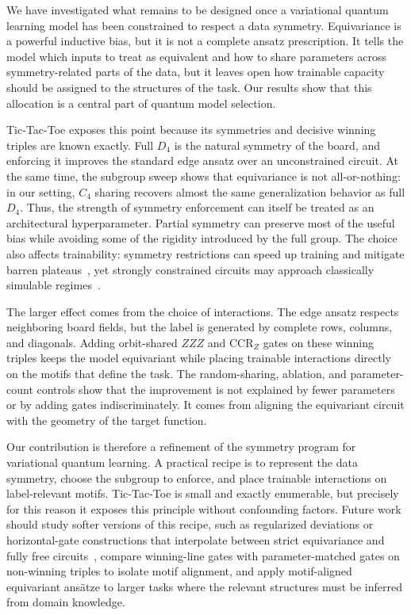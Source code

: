 We have investigated what remains to be designed once a variational quantum learning model has been constrained to respect a data symmetry. Equivariance is a powerful inductive bias, but it is not a complete ansatz prescription. It tells the model which inputs to treat as equivalent and how to share parameters across symmetry-related parts of the data, but it leaves open how trainable capacity should be assigned to the structures of the task. Our results show that this allocation is a central part of quantum model selection.

Tic-Tac-Toe exposes this point because its symmetries and decisive winning triples are known exactly. Full $D_4$ is the natural symmetry of the board, and enforcing it improves the standard edge ansatz over an unconstrained circuit. At the same time, the subgroup sweep shows that equivariance is not all-or-nothing: in our setting, $C_4$ sharing recovers almost the same generalization behavior as full $D_4$. Thus, the strength of symmetry enforcement can itself be treated as an architectural hyperparameter. Partial symmetry can preserve most of the useful bias while avoiding some of the rigidity introduced by the full group. The choice also affects trainability: symmetry restrictions can speed up training and mitigate barren plateaus~\cite{sauvage2024building,cerezo2023simulability}, yet strongly constrained circuits may approach classically simulable regimes~\cite{cerezo2023simulability}.

The larger effect comes from the choice of interactions. The edge ansatz respects neighboring board fields, but the label is generated by complete rows, columns, and diagonals. Adding orbit-shared $ZZZ$ and $\mathrm{CCR}_Z$ gates on these winning triples keeps the model equivariant while placing trainable interactions directly on the motifs that define the task. The random-sharing, ablation, and parameter-count controls show that the improvement is not explained by fewer parameters or by adding gates indiscriminately. It comes from aligning the equivariant circuit with the geometry of the target function.

Our contribution is therefore a refinement of the symmetry program for variational quantum learning. A practical recipe is to represent the data symmetry, choose the subgroup to enforce, and place trainable interactions on label-relevant motifs. Tic-Tac-Toe is small and exactly enumerable, but precisely for this reason it exposes this principle without confounding factors. Future work should study softer versions of this recipe, such as regularized deviations or horizontal-gate constructions that interpolate between strict equivariance and fully free circuits~\cite{wiersema2025horizontal}, compare winning-line gates with parameter-matched gates on non-winning triples to isolate motif alignment, and apply motif-aligned equivariant ans\"atze to larger tasks where the relevant structures must be inferred from domain knowledge.
